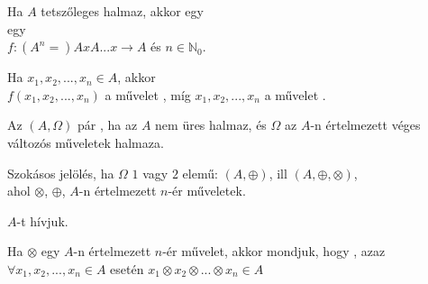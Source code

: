 \begin{frame}
\begin{tcolorbox}[title={Def.:Algebrai struktúrák, izomorfiájuk}]
Ha $A$ tetszőleges halmaz, akkor egy\\
 egy\\
$f : (A^n =) A x A ... x \rightarrow A$ és $n \in \mathbb{N}_0$.\\
\msmallskip

Ha $x_1, x_2, ..., x_n\in A$, akkor\\
$f(x_1, x_2, ..., x_n)$ a művelet , míg $x_1, x_2, ..., x_n$ a művelet .\\
\msmallskip

Az $(A, {\Omega})$ pár , ha az $A$ nem üres halmaz, és $\Omega$ az $A$-n értelmezett véges változós műveletek halmaza.\\
\msmallskip

Szokásos jelölés, ha $\Omega$ $1$ vagy $2$ elemű: $(A, {\oplus})$, ill $(A, {\oplus}, {\otimes})$,\\
ahol $\otimes$, $\oplus$, $A$-n értelmezett $n$-ér műveletek.\\
\msmallskip

$A$-t  hívjuk.
\end{tcolorbox}

\begin{tcolorbox}[title={Def.: Műveleti zártság}]
Ha $\otimes$ egy $A$-n értelmezett $n$-ér művelet, akkor mondjuk, hogy , azaz ${\forall}x_1, x_2, ..., x_n \in A$ esetén $x_1 \otimes x_2 \otimes ... \otimes x_n \in A$
\end{tcolorbox}
\end{frame}

